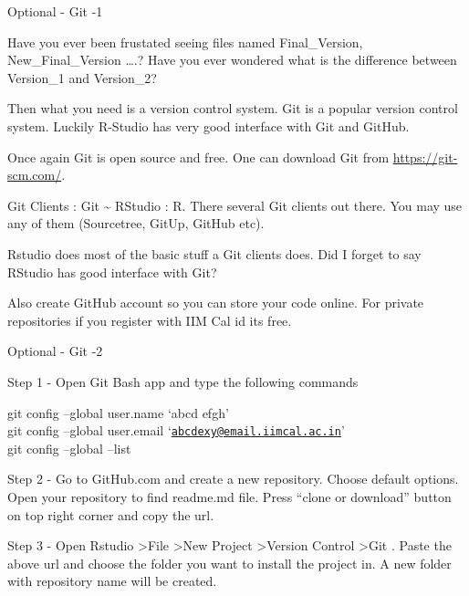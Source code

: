 \documentclass[ignorenonframetext,]{beamer}
\begin{document}
\begin{frame}{Optional - Git -1}
\protect\hypertarget{optional---git--1}{}

Have you ever been frustated seeing files named Final\_Version,
New\_Final\_Version \ldots{}.? Have you ever wondered what is the
difference between Version\_1 and Version\_2?

Then what you need is a version control system. Git is a popular version
control system. Luckily R-Studio has very good interface with Git and
GitHub.

Once again Git is open source and free. One can download Git from
\url{https://git-scm.com/}.

Git Clients : Git \textasciitilde{} RStudio : R. There several Git
clients out there. You may use any of them (Sourcetree, GitUp, GitHub
etc).

Rstudio does most of the basic stuff a Git clients does. Did I forget to
say RStudio has good interface with Git?

Also create GitHub account so you can store your code online. For
private repositories if you register with IIM Cal id its free.

\end{frame}

\begin{frame}{Optional - Git -2}
\protect\hypertarget{optional---git--2}{}

Step 1 - Open Git Bash app and type the following commands

git config --global user.name `abcd efgh'\\
git config --global user.email
`\href{mailto:abcdexy@email.iimcal.ac.in}{\nolinkurl{abcdexy@email.iimcal.ac.in}}'\\
git config --global --list

Step 2 - Go to GitHub.com and create a new repository. Choose default
options. Open your repository to find readme.md file. Press ``clone or
download'' button on top right corner and copy the url.

Step 3 - Open Rstudio \textgreater{}File \textgreater{}New Project
\textgreater{}Version Control \textgreater{}Git . Paste the above url
and choose the folder you want to install the project in. A new folder
with repository name will be created.

\end{frame}
\end{document}
